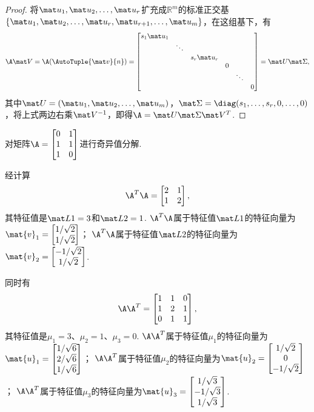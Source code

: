 \begin{theorem}
\begin{proof}
将\(\p_1,\p_2,\dotsc,\p_r\)扩充成\(\mathbb{R}^m\)的标准正交基\(\{\p_1,\p_2,\dotsc,\p_r,\p_{r+1},\dotsc,\p_m\}\)，在这组基下，有\[
\A\Q = \A(\AutoTuple{\q}{n}) = \begin{bmatrix}
s_1 \p_1 \\
& \ddots \\
& & s_r \p_r \\
& & & 0 \\
& & & & \ddots \\
& & & & & 0
\end{bmatrix}
= \P \S,
\]其中\(\P = (\p_1,\p_2,\dotsc,\p_m)\)，\(\S = \diag(s_1,\dotsc,s_r,0,\dotsc,0)\)，将上式两边右乘\(\Q^{-1}\)，即得\(\A = \P\S\Q^T\).
\end{proof}
\end{theorem}

\begin{example}
\def\U{\mat{U}}
\def\S{\mat{\Sigma}}
\def\V{\mat{V}}
\def\M#1{\mu_{#1}}
对矩阵\(\A = \begin{bmatrix} 0 & 1 \\ 1 & 1 \\ 1 & 0 \end{bmatrix}\)进行奇异值分解.
\begin{solution}
经计算\[
\A^T \A = \begin{bmatrix} 2 & 1 \\ 1 & 2 \end{bmatrix},
\]其特征值是\(\L{1} = 3\)和\(\L{2} = 1\).
\(\A^T \A\)属于特征值\(\L{1}\)的特征向量为\(\mat{v}_1 = \begin{bmatrix} 1/\sqrt{2} \\ 1/\sqrt{2} \end{bmatrix}\)；
\(\A^T \A\)属于特征值\(\L{2}\)的特征向量为\(\mat{v}_2 = \begin{bmatrix} -1/\sqrt{2} \\ 1/\sqrt{2} \end{bmatrix}\).

同时有\[
\A \A^T = \begin{bmatrix} 1 & 1 & 0 \\ 1 & 2 & 1 \\ 0 & 1 & 1 \end{bmatrix},
\]其特征值是\(\M{1} = 3\)、\(\M{2} = 1\)、\(\M{3} = 0\).
\(\A \A^T\)属于特征值\(\M{1}\)的特征向量为\(\mat{u}_1 = \begin{bmatrix} 1/\sqrt{6} \\ 2/\sqrt{6} \\ 1/\sqrt{6} \end{bmatrix}\)；
\(\A \A^T\)属于特征值\(\M{2}\)的特征向量为\(\mat{u}_2 = \begin{bmatrix} 1/\sqrt{2} \\ 0 \\ -1/\sqrt{2} \end{bmatrix}\)；
\(\A \A^T\)属于特征值\(\M{3}\)的特征向量为\(\mat{u}_3 = \begin{bmatrix} 1/\sqrt{3} \\ -1/\sqrt{3} \\ 1/\sqrt{3} \end{bmatrix}\).


\end{solution}
\end{example}
